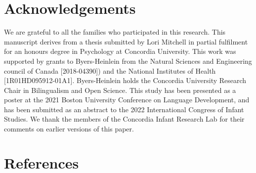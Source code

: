 \documentclass[
  english,
  ,man,floatsintext]{apa6}
\begin{document}
\newpage

\hypertarget{acknowledgements}{%
\section{Acknowledgements}\label{acknowledgements}}

\noindent We are grateful to all the families who participated in this research. This manuscript derives from a thesis submitted by Lori Mitchell in partial fulfilment for an honours degree in Psychology at Concordia University. This work was supported by grants to Byers-Heinlein from the Natural Sciences and Engineering council of Canada {[}2018-04390{]}) and the National Institutes of Health {[}1R01HD095912-01A1{]}. Byers-Heinlein holds the Concordia University Research Chair in Bilingualism and Open Science. This study has been presented as a poster at the 2021 Boston University Conference on Language Development, and has been submitted as an abstract to the 2022 International Congress of Infant Studies. We thank the members of the Concordia Infant Research Lab for their comments on earlier versions of this paper.

\newpage

\hypertarget{references}{%
\section{References}\label{references}}

\begingroup
\setlength{\parindent}{-0.5in}
\end{document}
